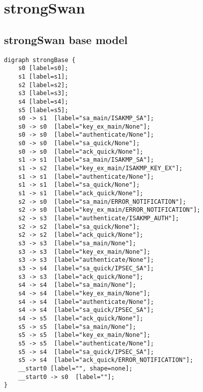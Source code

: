 \section*{strongSwan}
\subsection*{strongSwan base model}
\begin{lstlisting}[numbers=none]
digraph strongBase {
	s0 [label=s0];
	s1 [label=s1];
	s2 [label=s2];
	s3 [label=s3];
	s4 [label=s4];
	s5 [label=s5];
	s0 -> s1  [label="sa_main/ISAKMP_SA"];
	s0 -> s0  [label="key_ex_main/None"];
	s0 -> s0  [label="authenticate/None"];
	s0 -> s0  [label="sa_quick/None"];
	s0 -> s0  [label="ack_quick/None"];
	s1 -> s1  [label="sa_main/ISAKMP_SA"];
	s1 -> s2  [label="key_ex_main/ISAKMP_KEY_EX"];
	s1 -> s1  [label="authenticate/None"];
	s1 -> s1  [label="sa_quick/None"];
	s1 -> s1  [label="ack_quick/None"];
	s2 -> s0  [label="sa_main/ERROR_NOTIFICATION"];
	s2 -> s0  [label="key_ex_main/ERROR_NOTIFICATION"];
	s2 -> s3  [label="authenticate/ISAKMP_AUTH"];
	s2 -> s2  [label="sa_quick/None"];
	s2 -> s2  [label="ack_quick/None"];
	s3 -> s3  [label="sa_main/None"];
	s3 -> s3  [label="key_ex_main/None"];
	s3 -> s3  [label="authenticate/None"];
	s3 -> s4  [label="sa_quick/IPSEC_SA"];
	s3 -> s3  [label="ack_quick/None"];
	s4 -> s4  [label="sa_main/None"];
	s4 -> s4  [label="key_ex_main/None"];
	s4 -> s4  [label="authenticate/None"];
	s4 -> s4  [label="sa_quick/IPSEC_SA"];
	s4 -> s5  [label="ack_quick/None"];
	s5 -> s5  [label="sa_main/None"];
	s5 -> s5  [label="key_ex_main/None"];
	s5 -> s5  [label="authenticate/None"];
	s5 -> s4  [label="sa_quick/IPSEC_SA"];
	s5 -> s4  [label="ack_quick/ERROR_NOTIFICATION"];
	__start0 [label="", shape=none];
	__start0 -> s0  [label=""];
}
\end{lstlisting}
\newpage

